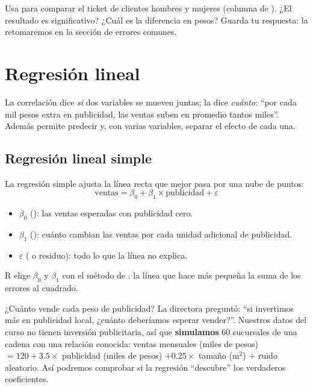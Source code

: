 \begin{hazlotu}
Usa  para comparar el ticket de clientes hombres y mujeres
(columna  de ). ¿El resultado es
significativo? ¿Cuál es la diferencia en pesos? Guarda tu respuesta: la
retomaremos en la sección de errores comunes.
\end{hazlotu}

\section{Regresión lineal}
\label{sec:m4-regresion}

La correlación dice \emph{si} dos variables se mueven juntas; la
 dice \emph{cuánto}: ``por cada mil pesos extra en
publicidad, las ventas suben en promedio tantos miles''. Además permite
predecir y, con varias variables, separar el efecto de cada una.

\subsection{Regresión lineal simple}

La regresión simple ajusta la línea recta que mejor pasa por una nube de
puntos:
\[
  \text{ventas} = \beta_0 + \beta_1 \times \text{publicidad} + \varepsilon
\]
\begin{itemize}
  \item $\beta_0$ (): las ventas esperadas con
        publicidad cero.
  \item $\beta_1$ (): cuánto cambian las ventas por cada
        unidad adicional de publicidad.
  \item $\varepsilon$ ( o residuo): todo lo que la línea no
        explica.
\end{itemize}
R elige $\beta_0$ y $\beta_1$ con el método de :
la línea que hace más pequeña la suma de los errores al cuadrado.

\begin{ejemplo}{¿Cuánto vende cada peso de publicidad?}
La directora preguntó: ``si invertimos más en publicidad local, ¿cuánto
deberíamos esperar vender?''. Nuestros datos del curso no tienen inversión
publicitaria, así que \textbf{simulamos} 60 sucursales de una cadena con una
relación conocida: ventas mensuales (miles de pesos) $= 120 + 3.5 \times$
publicidad (miles de pesos) $+ 0.25 \times$ tamaño (m$^2$) $+$ ruido
aleatorio. Así podremos comprobar si la regresión ``descubre'' los
verdaderos coeficientes.
\end{ejemplo}


